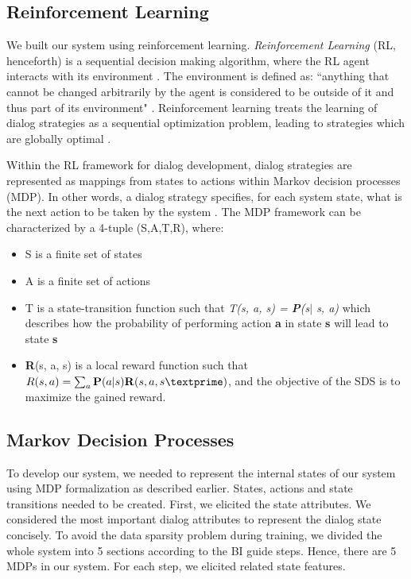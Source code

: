 \begin{sloppy}
\subsection{Reinforcement Learning}

We built our system using reinforcement learning.
{\em Reinforcement Learning} (RL, henceforth) is a sequential decision making algorithm, where the RL agent interacts with its environment \cite{sutton1998reinforcement}. The environment is defined as: ``anything that cannot be changed arbitrarily by the agent is considered to be outside of it and thus part of its environment" \cite[p. 53] {sutton1998reinforcement}.  Reinforcement learning treats the learning of dialog strategies as a sequential optimization problem, leading to strategies which are globally optimal \cite{sutton1998reinforcement}. 

Within the RL framework for dialog development, dialog strategies are represented as mappings from states to actions within Markov decision processes (MDP). In other words, a dialog strategy specifies, for each system state, what is the next action to be taken by the system \cite{levin1998}. The MDP framework can be characterized by a 4-tuple (S,A,T,R), where:
\begin{itemize}
\item S is a finite set of states
\item A is a finite set of actions
\item T is a state-transition function such that \textit{T(s, a, s\textprime) = {\bf P}(s\textprime $\vert$ s, a)} which describes how the probability of performing action \textbf{a} in state \textbf{s} will lead to state \textbf{s\textprime}
\item {\bf R}(s, a, s\textprime) is a local reward function such that $ R(s, a)=\sum_a {\bf P}(a \vert s){\bf R}(s, a, s\textprime) $, and the objective of the SDS is to maximize the gained reward.
\end{itemize}



\subsection{Markov Decision Processes}

To develop our system, we needed to represent the internal states of our system using MDP formalization as described  earlier. States, actions and state transitions needed to be created. First, we elicited the state attributes. We considered the most important dialog attributes to represent the dialog state concisely. To avoid the data sparsity problem during training, we divided the whole system into 5 sections according to the BI guide steps. Hence, there are 5 MDPs in our system. For each step, we elicited related state features. 


\end{sloppy}
